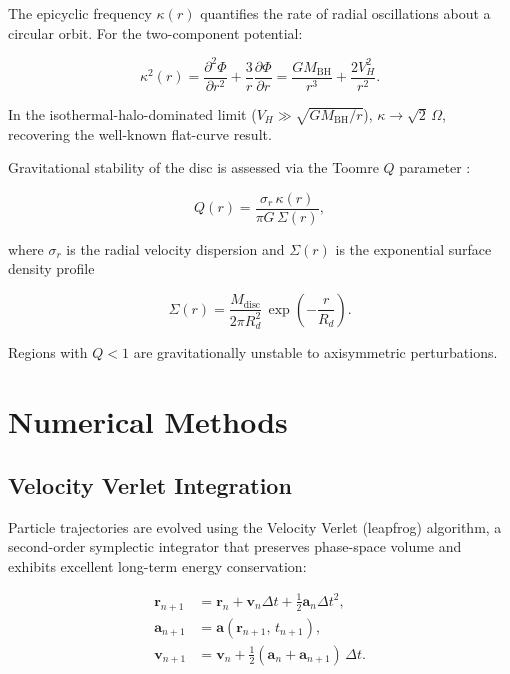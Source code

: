 \documentclass[12pt, letterpaper]{article}
\begin{document}
The epicyclic frequency $\kappa(r)$ quantifies the rate of radial oscillations about a circular orbit. For the two-component potential:

\begin{equation}
    \kappa^2(r) = \frac{\partial^2 \Phi}{\partial r^2} + \frac{3}{r}\frac{\partial \Phi}{\partial r}
    = \frac{G M_\text{BH}}{r^3} + \frac{2 V_H^2}{r^2}.
\end{equation}

In the isothermal-halo-dominated limit ($V_H \gg \sqrt{GM_\text{BH}/r}$), $\kappa \to \sqrt{2}\,\Omega$, recovering the well-known flat-curve result.

Gravitational stability of the disc is assessed via the Toomre $Q$ parameter \citep{Toomre1964}:

\begin{equation}
    Q(r) = \frac{\sigma_r\,\kappa(r)}{\pi G\,\Sigma(r)},
\end{equation}

where $\sigma_r$ is the radial velocity dispersion and $\Sigma(r)$ is the exponential surface density profile

\begin{equation}
    \Sigma(r) = \frac{M_\text{disc}}{2\pi R_d^2}\,\exp\!\left(-\frac{r}{R_d}\right).
\end{equation}

Regions with $Q < 1$ are gravitationally unstable to axisymmetric perturbations.

\section{Numerical Methods}
\label{sec:methods}

\subsection{Velocity Verlet Integration}

Particle trajectories are evolved using the Velocity Verlet (leapfrog) algorithm, a second-order symplectic integrator that preserves phase-space volume and exhibits excellent long-term energy conservation:

\begin{align}
    \mathbf{r}_{n+1} &= \mathbf{r}_n + \mathbf{v}_n \Delta t + \tfrac{1}{2}\mathbf{a}_n \Delta t^2, \\
    \mathbf{a}_{n+1} &= \mathbf{a}(\mathbf{r}_{n+1},\, t_{n+1}), \\
    \mathbf{v}_{n+1} &= \mathbf{v}_n + \tfrac{1}{2}(\mathbf{a}_n + \mathbf{a}_{n+1})\,\Delta t.
\end{align}
\end{document}
